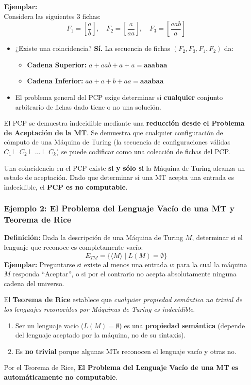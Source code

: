 \textbf{Ejemplar:} \\
Considera las siguientes 3 fichas:
\[
    F_1 = \left[\frac{a}{b}\right], \quad F_2 = \left[\frac{a}{aa}\right], \quad F_3 = \left[\frac{aab}{a}\right]
\]
\begin{itemize}
    \item ¿Existe una coincidencia? \textbf{Sí.} La secuencia de fichas $(F_2, F_3, F_1, F_2)$ da:
    \begin{itemize}
        \item \textbf{Cadena Superior:} $a + aab + a + a = \mathbf{aaabaa}$
        \item \textbf{Cadena Inferior:} $aa + a + b + aa = \mathbf{aaabaa}$
    \end{itemize}
    \item El problema general del PCP exige determinar si \textbf{cualquier} conjunto arbitrario de fichas dado tiene o no una solución.
\end{itemize}

El PCP se demuestra indecidible mediante una \textbf{reducción desde el Problema de Aceptación de la MT}. Se demuestra que cualquier configuración de cómputo de una Máquina de Turing (la secuencia de configuraciones válidas $C_1 \vdash C_2 \vdash \dots \vdash C_k$) se puede codificar como una colección de fichas del PCP. 

Una coincidencia en el PCP existe \textbf{si y sólo si} la Máquina de Turing alcanza un estado de aceptación. Dado que determinar si una MT acepta una entrada es indecidible, el \textbf{PCP es no computable}.

\subsubsection*{Ejemplo 2: El Problema del Lenguaje Vacío de una MT y Teorema de Rice \cite{carrion_teoria}}

\textbf{Definición:} Dada la descripción de una Máquina de Turing $M$, determinar si el lenguaje que reconoce es completamente vacío:
\[
    E_{TM} = \{ \langle M \rangle \mid L(M) = \emptyset \}
\]
\textbf{Ejemplar:} Preguntarse si existe al menos una entrada $w$ para la cual la máquina $M$ responda ``Aceptar'', o si por el contrario no acepta absolutamente ninguna cadena del universo.

El \textbf{Teorema de Rice} establece que \textit{cualquier propiedad semántica no trivial de los lenguajes reconocidos por Máquinas de Turing es indecidible}.

\begin{enumerate}
    \item Ser un lenguaje vacío ($L(M) = \emptyset$) es una \textbf{propiedad semántica} (depende del lenguaje aceptado por la máquina, no de su sintaxis).
    \item Es \textbf{no trivial} porque algunas MTs reconocen el lenguaje vacío y otras no.
\end{enumerate}

Por el Teorema de Rice, \textbf{El Problema del Lenguaje Vacío de una MT es automáticamente no computable}.